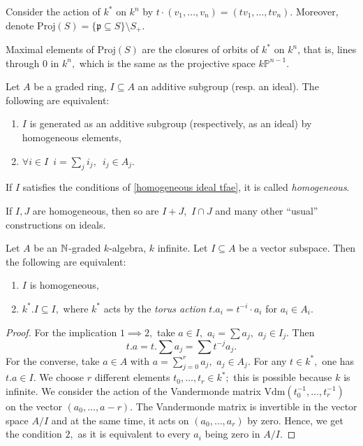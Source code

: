 Consider the action of \(k^*\) on \(k^n\) by \(t \cdot (v_1, \dotsc, v_n) = (tv_1, \dotsc, tv_n).\) Moreover, denote
\(\mathrm{Proj} (S) = \{ \mathfrak p \subseteq S\} \setminus S_+.\)

\begin{corollary}
  Maximal elements of \(\mathrm{Proj}(S)\) are the closures of orbits of \(k^*\) on \(k^n\), that is, lines through \(0\) in \(k^n,\) which is the same as the projective space \(k \mathbb P^{n-1}.\)
\end{corollary}

\begin{lemma}
  \label{homogeneous ideal tfae}
  Let \(A\) be a graded ring, \(I \subseteq A\) an additive subgroup (resp. an ideal). The following are equivalent:
  \begin{enumerate}
  \item \(I\) is generated as an additive subgroup (respectively, as an ideal) by homogeneous elements,
  \item \(\forall i \in I \enspace i = \sum_j i_j, \enspace i_j \in A_j.\)
  \end{enumerate}
\end{lemma}

\begin{df}
  If \(I\) satisfies the conditions of \cref{homogeneous ideal tfae}, it is called \emph{homogeneous}.
\end{df}

\begin{note}
  If \(I, J\) are homogeneous, then so are \(I + J,\) \(I \cap J\) and many other ``usual'' constructions on ideals.
\end{note}

\begin{lemma}
  Let \(A\) be an \(\mathbb N\)-graded \(k\)-algebra, \(k\) infinite. Let \(I \subseteq A\) be a vector subspace. Then the following are equivalent:
  \begin{enumerate}
  \item \(I\) is homogeneous,
  \item \(k^*. I \subseteq I,\) where \(k^*\) acts by the \emph{torus action} \(t.a_i = t^{-i} \cdot a_i\) for \(a_i \in A_i.\)
  \end{enumerate}
\end{lemma}

\begin{proof}
  For the implication \(1 \implies 2,\) take \(a \in I,\) \(a_i = \sum a_j,\) \(a_j \in I_j.\) Then
  \[t.a = t.\sum a_j = \sum t^{-j}a_j.\]
  For the converse, take \(a \in A\) with \(a = \sum_{j=0}^r a_j,\) \(a_j \in A_j.\) For any \(t \in k^*,\) one has \(t.a \in I.\) We choose \(r\) different elements
  \(t_0, \dotsc, t_r \in k^*;\) this is possible because \(k\) is infinite.
  We consider the action of the Vandermonde matrix \(\mathrm{Vdm}(t_0^{-1}, \dotsc, t_r^{-1})\) on the vector \((a_0, \dotsc, a-r).\) The Vandermonde matrix is invertible in the vector space \(A/{I}\) and at the same time, it acts on \((a_0, \dotsc, a_r)\) by zero. Hence, we get the condition \(2,\) as it is equivalent to every \(a_i\) being zero in \(A/{I}.\)
\end{proof}

